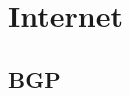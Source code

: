 \documentclass[a4paper,12pt,twoside,twocolumn]{book}
\begin{document}

\chapter{Internet}

\section{BGP}


\renewcommand{\listfigurename}{List of {\footnotesize hidden} Figures}
\listoffigures


\renewcommand{\listtablename}{Tables {\footnotesize hidding} on the pages}
\listoftables





\end{document}
